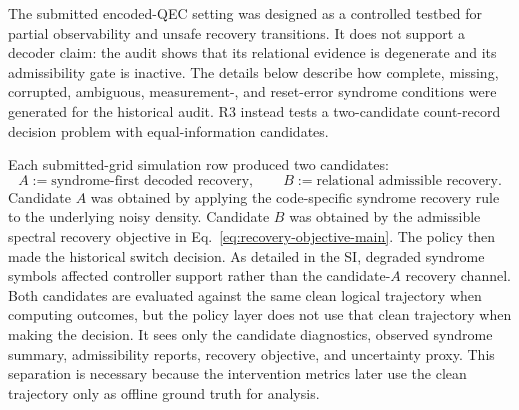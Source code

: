 \documentclass{iopjournal}
\begin{document}
The submitted encoded-QEC setting was designed as a controlled testbed for partial
observability and unsafe recovery transitions. It does not support a decoder claim:
the audit shows that its relational evidence is degenerate and its admissibility
gate is inactive. The details below describe how complete, missing, corrupted,
ambiguous, measurement-, and reset-error syndrome conditions were generated for
the historical audit. R3 instead tests a two-candidate count-record decision
problem with equal-information candidates.

Each submitted-grid simulation row produced two candidates:
\begin{equation}
A := \text{syndrome-first decoded recovery},
\qquad
B := \text{relational admissible recovery}.
\end{equation}
Candidate $A$ was obtained by applying the code-specific syndrome recovery rule to
the underlying noisy density. Candidate $B$ was obtained by the admissible
spectral recovery objective in Eq.~\eqref{eq:recovery-objective-main}. The policy
then made the historical switch decision. As detailed in the SI, degraded syndrome
symbols affected controller support rather than the candidate-$A$ recovery
channel.
Both candidates are evaluated against the same clean logical trajectory when
computing outcomes, but the policy layer does not use that clean trajectory when
making the decision. It sees only the candidate diagnostics, observed syndrome
summary, admissibility reports, recovery objective, and uncertainty proxy. This
separation is necessary because the intervention metrics later use the clean
trajectory only as offline ground truth for analysis.
\end{document}
